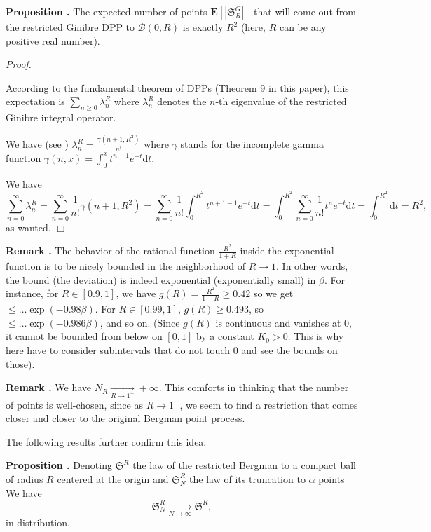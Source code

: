 \documentclass[11pt]{article}
\newcommand{\qed}{\hfill$\Box$}
\newcounter{cnt}
\newcommand{\cnt}{\thecnt \stepcounter{cnt}}
\begin{document}
\textbf{Proposition \cnt.} The expected number of points $\mathbf{E}[|\mathfrak{S}_R^G|]$ that will come out from the restricted Ginibre DPP to $\mathcal{B}(0,R)$ is exactly $R^2$ (here, $R$ can be any positive real number).

\textit{Proof.}

According to the fundamental theorem of DPPs (Theorem 9 in this paper), this expectation is $\sum\limits_{n \ge 0} \lambda_n^R$ where $\lambda_n^R$ denotes the $n$-th eigenvalue of the restricted Ginibre integral operator.

We have (see \cite{DecreusefondMoroz2021}) $\lambda_n^R = \frac{\gamma(n+1, R^2)}{n!}$ where $\gamma$ stands for the incomplete gamma function $\gamma(n,x) = \int_0^x t^{n-1}e^{-t} \mathrm dt$.

We have
\[
\sum_{n=0}^\infty \lambda_n^R = \sum_{n=0}^\infty \frac{1}{n!} \gamma(n+1, R^2) = \sum_{n=0}^\infty \frac{1}{n!} \int_0^{R^2} t^{n+1-1} e^{-t} \mathrm dt = \int_0^{R^2} \sum_{n=0}^\infty \frac{1}{n!} t^n e^{-t} \mathrm dt = \int_0^{R^2} \mathrm dt = R^2,
\]
as wanted. \qed

\textbf{Remark \cnt.} The behavior of the rational function $\frac{R^2}{1+R}$ inside the exponential function is to be nicely bounded in the neighborhood of $R \to 1$. In other words, the bound (the deviation) is indeed exponential (exponentially small) in $\beta$. For instance, for $R \in [0.9, 1]$, we have $g(R) = \frac{R^2}{1+R} \ge 0.42$ so we get $\leqslant \dots \exp(-0.98\beta)$. For $R \in [0.99, 1]$, $g(R) \ge 0.493$, so $\leqslant \dots \exp(-0.986\beta)$, and so on. (Since $g(R)$ is continuous and vanishes at 0, it cannot be bounded from below on $[0,1]$ by a constant $K_0 > 0$. This is why here have to consider subintervals that do not touch 0 and see the bounds on those).

\textbf{Remark \cnt.} We have $N_R \xrightarrow[R \to 1^-]{} +\infty$. This comforts in thinking that the number of points is well-chosen, since as $R \to 1^-$, we seem to find a restriction that comes closer and closer to the original Bergman point process.

The following results further confirm this idea.

\textbf{Proposition \cnt.} Denoting $\mathfrak{S}^R$ the law of the restricted Bergman to a compact ball of radius $R$ centered at the origin and $\mathfrak{S}_N^R$ the law of its truncation to $\alpha$ points We have
\[
\mathfrak{S}_N^R \xrightarrow[N \to \infty]{} \mathfrak{S}^R,
\]
in distribution.
\end{document}
